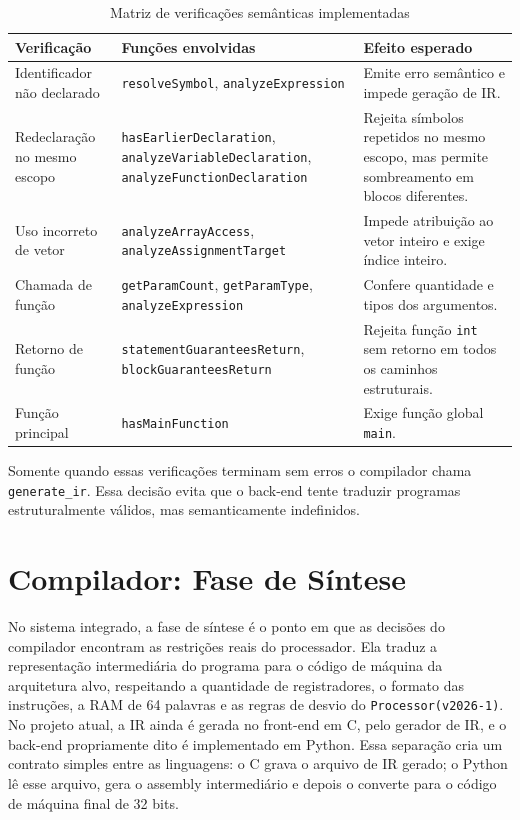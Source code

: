 \documentclass[
	12pt,				%
	oneside,
	a4paper,			%
	english,			%
	french,				%
	spanish,			%
	brazil,				%
	]{abntex2}
\begin{document}
\begin{table}[H]
    \centering
    \ABNTEXfontereduzida
    \caption{Matriz de verificações semânticas implementadas}
    \label{tab:matriz_semantica}
    \begin{tabular}{|p{}|p{}|p{}|}
        \hline
        \textbf{Verificação} & \textbf{Funções envolvidas} & \textbf{Efeito esperado} \\
        \hline
        Identificador não declarado & \texttt{resolveSymbol}, \texttt{analyzeExpression} & Emite erro semântico e impede geração de IR. \\
        \hline
        Redeclaração no mesmo escopo & \texttt{hasEarlierDeclaration}, \texttt{analyzeVariableDeclaration}, \texttt{analyzeFunctionDeclaration} & Rejeita símbolos repetidos no mesmo escopo, mas permite sombreamento em blocos diferentes. \\
        \hline
        Uso incorreto de vetor & \texttt{analyzeArrayAccess}, \texttt{analyzeAssignmentTarget} & Impede atribuição ao vetor inteiro e exige índice inteiro. \\
        \hline
        Chamada de função & \texttt{getParamCount}, \texttt{getParamType}, \texttt{analyzeExpression} & Confere quantidade e tipos dos argumentos. \\
        \hline
        Retorno de função & \texttt{statementGuaranteesReturn}, \texttt{blockGuaranteesReturn} & Rejeita função \texttt{int} sem retorno em todos os caminhos estruturais. \\
        \hline
        Função principal & \texttt{hasMainFunction} & Exige função global \texttt{main}. \\
        \hline
    \end{tabular}
\end{table}

Somente quando essas verificações terminam sem erros o compilador chama \texttt{generate\_ir}. Essa decisão evita que o back-end tente traduzir programas estruturalmente válidos, mas semanticamente indefinidos.

\chapter{Compilador: Fase de Síntese}
\label{cap:sintese}

No sistema integrado, a fase de síntese é o ponto em que as decisões do compilador encontram as restrições reais do processador. Ela traduz a representação intermediária do programa para o código de máquina da arquitetura alvo, respeitando a quantidade de registradores, o formato das instruções, a RAM de 64 palavras e as regras de desvio do \texttt{Processor(v2026-1)}. No projeto atual, a IR ainda é gerada no front-end em C, pelo gerador de IR, e o back-end propriamente dito é implementado em Python. Essa separação cria um contrato simples entre as linguagens: o C grava o arquivo de IR gerado; o Python lê esse arquivo, gera o assembly intermediário e depois o converte para o código de máquina final de 32 bits.
\end{document}
